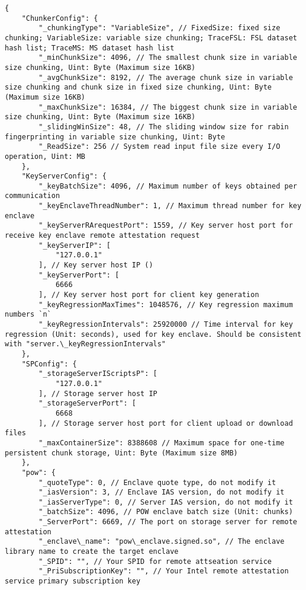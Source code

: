 \begin{lstlisting}[style=json]
{
    "ChunkerConfig": {
        "_chunkingType": "VariableSize", // FixedSize: fixed size chunking; VariableSize: variable size chunking; TraceFSL: FSL dataset hash list; TraceMS: MS dataset hash list
        "_minChunkSize": 4096, // The smallest chunk size in variable size chunking, Uint: Byte (Maximum size 16KB)
        "_avgChunkSize": 8192, // The average chunk size in variable size chunking and chunk size in fixed size chunking, Uint: Byte (Maximum size 16KB)
        "_maxChunkSize": 16384, // The biggest chunk size in variable size chunking, Uint: Byte (Maximum size 16KB)
        "_slidingWinSize": 48, // The sliding window size for rabin fingerprinting in variable size chunking, Uint: Byte
        "_ReadSize": 256 // System read input file size every I/O operation, Uint: MB
    },
    "KeyServerConfig": {
        "_keyBatchSize": 4096, // Maximum number of keys obtained per communication
        "_keyEnclaveThreadNumber": 1, // Maximum thread number for key enclave
        "_keyServerRArequestPort": 1559, // Key server host port for receive key enclave remote attestation request
        "_keyServerIP": [
            "127.0.0.1"
        ], // Key server host IP ()
        "_keyServerPort": [
            6666
        ], // Key server host port for client key generation
        "_keyRegressionMaxTimes": 1048576, // Key regression maximum numbers `n`
        "_keyRegressionIntervals": 25920000 // Time interval for key regression (Unit: seconds), used for key enclave. Should be consistent with "server.\_keyRegressionIntervals"
    },
    "SPConfig": {
        "_storageServerIScriptsP": [
            "127.0.0.1"
        ], // Storage server host IP
        "_storageServerPort": [
            6668
        ], // Storage server host port for client upload or download files
        "_maxContainerSize": 8388608 // Maximum space for one-time persistent chunk storage, Uint: Byte (Maximum size 8MB)
    },
    "pow": {
        "_quoteType": 0, // Enclave quote type, do not modify it
        "_iasVersion": 3, // Enclave IAS version, do not modify it
        "_iasServerType": 0, // Server IAS version, do not modify it
        "_batchSize": 4096, // POW enclave batch size (Unit: chunks)
        "_ServerPort": 6669, // The port on storage server for remote attestation
        "_enclave\_name": "pow\_enclave.signed.so", // The enclave library name to create the target enclave
        "_SPID": "", // Your SPID for remote attseation service
        "_PriSubscriptionKey": "", // Your Intel remote attestation service primary subscription key

\end{lstlisting}

